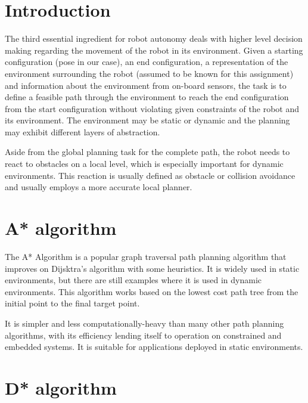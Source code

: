 \documentclass[12pt, a4paper, onecolumn]{article}
\begin{document}
\maketitle

\section{Introduction}

The third essential ingredient for robot autonomy deals with higher level decision making regarding the movement of the robot in its environment. 
Given a starting configuration (pose in our case), an end configuration, a representation of the environment surrounding the robot (assumed to be known for this assignment) and information about the environment from on-board sensors, the task is to define a feasible path through the environment to reach the end configuration from the start configuration without violating given constraints of the robot and its environment.
The environment may be static or dynamic and the planning may exhibit different layers of abstraction. 

Aside from the global planning task for the complete path, the robot needs to react to obstacles on a local level, which is especially important for dynamic environments.
This reaction is usually defined as obstacle or collision avoidance and usually employs a more accurate local planner.

\section{A* algorithm}

The A* Algorithm is a popular graph traversal path planning algorithm that improves on Dijsktra's algorithm with some heuristics.
It is widely used in static environments, but there are still examples where it is used in dynamic environments.
This algorithm works based on the lowest cost path tree from the initial point to the final target point. \cite{Karur21}

It is simpler and less computationally-heavy than many other path planning algorithms, with its efficiency lending itself to operation on constrained and embedded systems. It is
suitable for applications deployed in static environments. \cite{Karur21}

\section{D* algorithm}
\end{document}
